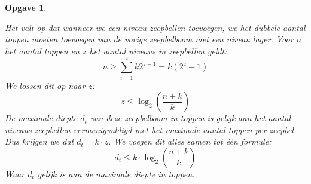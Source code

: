 \documentclass[12pt,hidelinks]{article}
\newtheorem{opgave}{Opgave}
\begin{document}
\begin{opgave}
\begin{enumerate}[a.]
            Het valt op dat wanneer we een niveau zeepbellen toevoegen, we het dubbele aantal toppen moeten toevoegen van de vorige zeepbelboom met een niveau lager. 
            Voor $n$ het aantal toppen en $z$ het aantal niveaus in zeepbellen geldt: 
            $$n \ge \sum\limits_{i=1}^z k2^{z-1} = k(2^z-1)$$
            We lossen dit op naar $z$: $$z \le \log_2{\left(\dfrac{n+k}{k}\right)}$$
            De maximale diepte $d_t$ van deze zeepbelboom in toppen is gelijk aan het aantal niveaus zeepbellen vermenigvuldigd met het maximale aantal toppen per zeepbel.
            Dus krijgen we dat $d_t=k\cdot z$.
            We voegen dit alles samen tot één formule:
            \begin{equation}
                d_t \le k \cdot \log_2{\left(\dfrac{n+k}{k}\right)}
                \label{topdiepte}
            \end{equation}
            Waar $d_t$ gelijk is aan de maximale diepte in toppen.
        \endgroup 
\end{enumerate}
    \end{opgave}    
\end{document}
